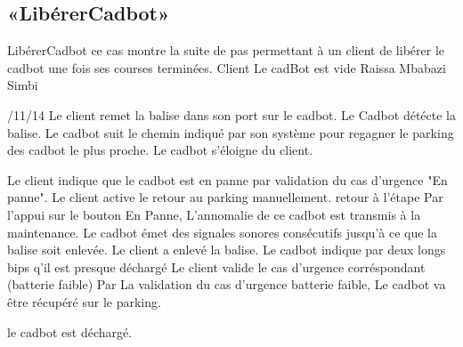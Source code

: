 \subsection{«LibérerCadbot»}
\startCU
\nom LibérerCadbot
\but ce cas montre la suite de pas permettant à un client de libérer le cadbot une fois ses courses terminées.
\acteur Client
\precondition Le cadBot est vide
\auteur Raissa Mbabazi Simbi
\date 7/11/14
\nominal %
\startnominal
\etape[LC:SA1] Le client remet la balise dans son port sur le cadbot.
\etape[LC:SA2] Le Cadbot détécte la balise.
\etape[LC:RETOUR] Le cadbot suit le chemin indiqué par son système pour regagner le parking des cadbot le plus proche.
\stopnominal
\postcondition Le cadbot s'éloigne du client.
\alternatifs
\startalternatif[LC:SA1] %

\etape Le client indique que le cadbot est en panne par validation du cas d'urgence "En panne".
\etape Le client active le retour au parking manuellement.
\etape retour à l'étape \in[LC:RETOUR]
\stopcondition
\postcondition Par l'appui sur le bouton En Panne, L'annomalie de ce cadbot est transmis à la maintenance.
\stopalternatif
\startalternatif[LC:SA1] %
\etape Le cadbot émet des signales sonores consécutifs jusqu'à ce que la balise soit enlevée.
\stopcondition
\postcondition Le client a enlevé la balise.
\stopalternatif
\startalternatif[LC:SA2] %
\etape Le cadbot indique par deux longs bips  q'il est presque déchargé
\etape Le client valide le cas d'urgence corréspondant (batterie faible)
\stopcondition
\postcondition Par La validation du cas d'urgence batterie faible, Le cadbot va être récupéré sur le parking.
\stopalternatif

\exception
le cadbot est déchargé.
\stopCU
